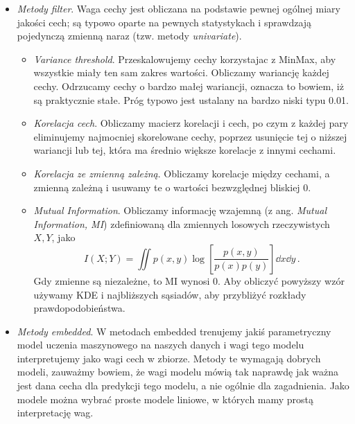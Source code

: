 \documentclass{myclass}
\numberwithin{equation}{subsection}
\begin{document}
\begin{itemize}
    
    \item \emph{Metody \textit{filter}}. Waga cechy jest obliczana na podstawie pewnej ogólnej miary
    jakości cech; są typowo oparte na pewnych statystykach i sprawdzają pojedynczą zmienną naraz
    (tzw. metody \textit{univariate}).
    
    \begin{itemize}

        \item \emph{\textit{Variance threshold}}. Przeskalowujemy cechy korzystajac z MinMax, aby
        wszystkie miały ten sam zakres wartości. Obliczamy wariancję każdej cechy. Odrzucamy cechy o
        bardzo małej wariancji, oznacza to bowiem, iż są praktycznie stałe. Próg typowo jest
        ustalany na bardzo niski typu 0.01.

        \item \emph{Korelacja cech}. Obliczamy macierz korelacji i cech, po czym z każdej pary
        eliminujemy najmocniej skorelowane cechy, poprzez usunięcie tej o niższej wariancji lub tej,
        która ma średnio większe korelacje z innymi cechami.

        \item \emph{Korelacja ze zmienną zależną}. Obliczamy korelacje między cechami, a zmienną
        zależną i usuwamy te o wartości bezwzględnej bliskiej 0. 

        \item \emph{\textit{Mutual Information}}. Obliczamy informację wzajemną (z ang.
        \textit{Mutual Information, MI}) zdefiniowaną dla zmiennych losowych rzeczywistych \(X, Y\),
        jako
        \begin{equation}
            I(X; Y) = \iint p(x, y) \log\left[\frac{p(x,y)}{p(x)p(y)}\right] \dd{x}\dd{y}\,.
        \end{equation}
        Gdy zmienne są niezależne, to MI wynosi 0. Aby obliczyć powyższy wzór używamy KDE i
        najbliższych sąsiadów, aby przybliżyć rozkłady prawdopodobieństwa.

    \end{itemize}

    \item \emph{Metody \textit{embedded}}. W metodach embedded trenujemy jakiś parametryczny model
    uczenia maszynowego na naszych danych i wagi tego modelu interpretujemy jako wagi cech w
    zbiorze. Metody te wymagają dobrych modeli, zauważmy bowiem, że wagi modelu mówią tak naprawdę
    jak ważna jest dana cecha dla predykcji tego modelu, a nie ogólnie dla zagadnienia. Jako modele
    można wybrać proste modele liniowe, w których mamy prostą interpretację wag.

\end{itemize}
\end{document}
